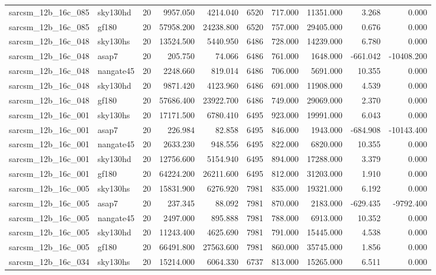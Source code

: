 \begin{tabular}{llrrrrrrrr}
sarcsm\_12b\_16c\_085 & sky130hd & 20 & 9957.050 & 4214.040 & 6520 & 717.000 & 11351.000 & 3.268 & 0.000 \\
sarcsm\_12b\_16c\_085 & gf180 & 20 & 57958.200 & 24238.800 & 6520 & 757.000 & 29405.000 & 0.676 & 0.000 \\
sarcsm\_12b\_16c\_048 & sky130hs & 20 & 13524.500 & 5440.950 & 6486 & 728.000 & 14239.000 & 6.780 & 0.000 \\
sarcsm\_12b\_16c\_048 & asap7 & 20 & 205.750 & 74.066 & 6486 & 761.000 & 1648.000 & -661.042 & -10408.200 \\
sarcsm\_12b\_16c\_048 & nangate45 & 20 & 2248.660 & 819.014 & 6486 & 706.000 & 5691.000 & 10.355 & 0.000 \\
sarcsm\_12b\_16c\_048 & sky130hd & 20 & 9871.420 & 4123.960 & 6486 & 691.000 & 11908.000 & 4.539 & 0.000 \\
sarcsm\_12b\_16c\_048 & gf180 & 20 & 57686.400 & 23922.700 & 6486 & 749.000 & 29069.000 & 2.370 & 0.000 \\
sarcsm\_12b\_16c\_001 & sky130hs & 20 & 17171.500 & 6780.410 & 6495 & 923.000 & 19991.000 & 6.043 & 0.000 \\
sarcsm\_12b\_16c\_001 & asap7 & 20 & 226.984 & 82.858 & 6495 & 846.000 & 1943.000 & -684.908 & -10143.400 \\
sarcsm\_12b\_16c\_001 & nangate45 & 20 & 2633.230 & 948.556 & 6495 & 822.000 & 6820.000 & 10.355 & 0.000 \\
sarcsm\_12b\_16c\_001 & sky130hd & 20 & 12756.600 & 5154.940 & 6495 & 894.000 & 17288.000 & 3.379 & 0.000 \\
sarcsm\_12b\_16c\_001 & gf180 & 20 & 64224.200 & 26211.600 & 6495 & 812.000 & 31203.000 & 1.910 & 0.000 \\
sarcsm\_12b\_16c\_005 & sky130hs & 20 & 15831.900 & 6276.920 & 7981 & 835.000 & 19321.000 & 6.192 & 0.000 \\
sarcsm\_12b\_16c\_005 & asap7 & 20 & 237.345 & 88.092 & 7981 & 870.000 & 2183.000 & -629.435 & -9792.400 \\
sarcsm\_12b\_16c\_005 & nangate45 & 20 & 2497.000 & 895.888 & 7981 & 788.000 & 6913.000 & 10.352 & 0.000 \\
sarcsm\_12b\_16c\_005 & sky130hd & 20 & 11243.400 & 4625.690 & 7981 & 791.000 & 15445.000 & 4.538 & 0.000 \\
sarcsm\_12b\_16c\_005 & gf180 & 20 & 66491.800 & 27563.600 & 7981 & 860.000 & 35745.000 & 1.856 & 0.000 \\
sarcsm\_12b\_16c\_034 & sky130hs & 20 & 15214.000 & 6064.330 & 6737 & 813.000 & 15265.000 & 6.511 & 0.000 \\

\end{tabular}
